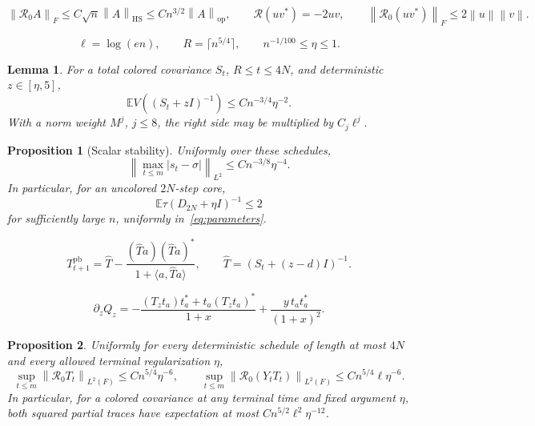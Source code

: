 \documentclass[10pt,a4paper]{amsart}
\newtheorem{lemma}{Lemma}
\newtheorem{proposition}{Proposition}
\newcommand{\E}{\mathbb E}
\newcommand{\HS}{\mathrm{HS}}
\newcommand{\R}{\mathcal R}
\newcommand{\ip}[2]{\langle#1,#2\rangle}
\newcommand{\norm}[1]{\left\lVert#1\right\rVert}
\newcommand{\op}{\mathrm{op}}
\begin{document}
\begin{equation}\label{eq:Rbounds}
 \norm{\R_0 A}_F\le C\sqrt n\norm A_{\HS}
 \le Cn^{3/2}\norm A_{\op},\qquad
 \R(uv^*)=-2uv,\qquad
 \norm{\R_0(uv^*)}_F\le2\norm u\norm v.
\end{equation}

\begin{equation}\label{eq:parameters}
 \ell=\log(en),\qquad R=\lceil n^{5/4}\rceil,\qquad
 n^{-1/100}\le\eta\le1.
\end{equation}

\begin{lemma}\label{lem:diag-resolvent}
For a total colored covariance $S_t$, $R\le t\le4N$, and deterministic $z\in[\eta,5]$,
\begin{equation}\label{eq:diag-resolvent}
 \E V((S_t+zI)^{-1})\le C n^{-3/4}\eta^{-2}.
\end{equation}
With a norm weight $M^j$, $j\le8$, the right side may be multiplied by $C_j\ell^j$.
\end{lemma}

\begin{proposition}[Scalar stability]\label{prop:scalar}
Uniformly over these schedules,
\begin{equation}\label{eq:scalar-stability}
 \left\|\max_{t\le m}|s_t-\sigma|\right\|_{L^2}
 \le C n^{-3/8}\eta^{-4}.
\end{equation}
In particular, for an uncolored $2N$-step core,
\begin{equation}\label{eq:scalar-final}
 \E\tau(D_{2N}+\eta I)^{-1}\le2
\end{equation}
for sufficiently large $n$, uniformly in~\eqref{eq:parameters}.
\end{proposition}

\begin{equation}\label{eq:exact-resolvent}
 T_{t+1}^{\mathrm{pb}}
 =\widehat T-\frac{(\widehat T a)(\widehat T a)^*}
                       {1+\ip a{\widehat T a}},\qquad
 \widehat T=(S_t+(z-d)I)^{-1}.
\end{equation}

\begin{equation}\label{eq:rank-derivative-expanded}
 \partial_zQ_z
 =-\frac{(T_zt_a)t_a^*+t_a(T_zt_a)^*}{1+x}
   +\frac{y\,t_at_a^*}{(1+x)^2}.
\end{equation}

\begin{proposition}\label{prop:partial-resolvent}
Uniformly for every deterministic schedule of length at most $4N$ and every allowed terminal regularization $\eta$,
\begin{equation}\label{eq:partial-resolvent}
 \sup_{t\le m}\norm{\R_0T_t}_{L^2(F)}
 \le Cn^{5/4}\eta^{-6},\qquad
 \sup_{t\le m}\norm{\R_0(Y_tT_t)}_{L^2(F)}
 \le Cn^{5/4}\ell\eta^{-6}.
\end{equation}
In particular, for a colored covariance at any terminal time and fixed argument $\eta$, both squared partial traces have expectation at most
$Cn^{5/2}\ell^2\eta^{-12}$.
\end{proposition}
\end{document}
